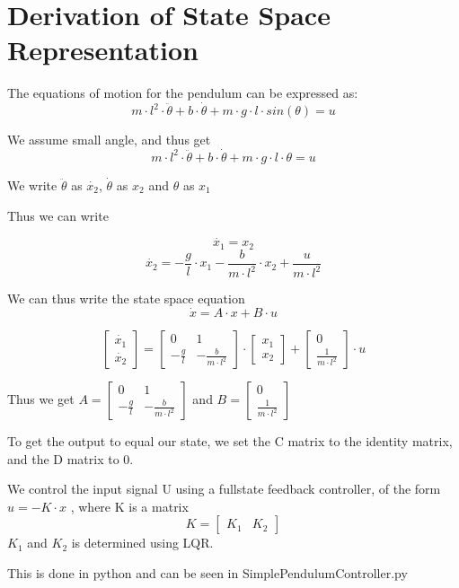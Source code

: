 \documentclass[a4paper,12pt,english]{article}
\author{Stefan Ravn van Overeem – stvan13@student.sdu.dk}
\begin{document}
\maketitle
\newpage

\section{Derivation of State Space Representation}
The equations of motion for the pendulum can be expressed as:
$$m \cdot  l^2  \cdot \ddot{\theta} + b  \cdot \dot{\theta} + m  \cdot g  \cdot l  \cdot sin(\theta) = u$$

We assume small angle, and thus get
$$m \cdot  l^2  \cdot \ddot{\theta} + b  \cdot \dot{\theta} + m  \cdot g  \cdot l  \cdot \theta = u$$


We write $\ddot{\theta}$ as $\dot{x_2}$,
$\dot{\theta}$ as $x_2$
and $\theta$ as $x_1$

Thus we can write

$$\dot{x_1} = x_2$$
$$\dot{x_2} = -\frac{g}{l} \cdot x_1 - \frac{b}{m \cdot l^2} \cdot x_2 + \frac{u}{m \cdot l^2}$$

We can thus write the state space equation
$$\dot{x} = A \cdot x + B \cdot u$$

$$
\begin{bmatrix}
\dot{x_1} \\
\dot{x_2}
\end{bmatrix}
=
\begin{bmatrix}
	0 & 1 \\
	-\frac{g}{l} & -\frac{b}{m \cdot l^2}
\end{bmatrix}
\cdot
\begin{bmatrix}
x_1 \\
x_2
\end{bmatrix}
+
\begin{bmatrix}
0 \\
\frac{1}{m \cdot l^2}
\end{bmatrix}
\cdot u
$$

Thus we get
$
A = \begin{bmatrix}
	0 & 1 \\
	-\frac{g}{l} & -\frac{b}{m \cdot l^2}
\end{bmatrix}
$
and
$
B = \begin{bmatrix}
0 \\
\frac{1}{m \cdot l^2}
\end{bmatrix}
$

To get the output to equal our state, we set the C matrix to the identity matrix, and the D matrix to 0.

We control the input signal U using a fullstate feedback controller, of the form 
$u = -K \cdot x$
, where K is a matrix
$$
K = \begin{bmatrix}
K_1 & K_2
\end{bmatrix}
$$
$K_1$ and $K_2$ is determined using LQR.

This is done in python and can be seen in SimplePendulumController.py
\end{document}
